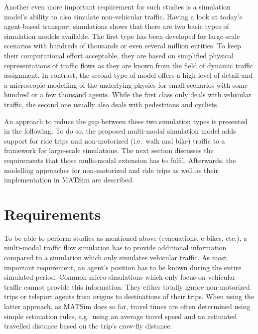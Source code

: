 Another even more important requirement for such studies is a simulation model's ability to also simulate non-vehicular traffic. Having a look at today's agent-based transport simulations shows that there are two basic types of simulation models available. The first type has been developed for large-scale scenarios with hundreds of thousands or even several million entities. To keep their computational effort acceptable, they are based on simplified physical representations of traffic flows as they are known from the field of dynamic traffic assignment. In contrast, the second type of model offers a high level of detail and a microscopic modelling of the underlying physics for small scenarios with some hundred or a few thousand agents. While the first class only deals with vehicular traffic, the second one usually also deals with pedestrians and cyclists.

An approach to reduce the gap between these two simulation types is presented in the following. To do so, the proposed multi-modal simulation model adds support for ride trips and non-motorized (i.e.~walk and bike) traffic to a framework for large-scale simulations. The next section discusses the requirements that those multi-modal extension has to fulfil. Afterwards, the modelling approaches for non-motorized and ride trips as well as their implementation in MATSim are described.

\section{Requirements}
To be able to perform studies as mentioned above (evacuations, e-bikes, etc.), a multi-modal traffic flow simulation has to provide additional information compared to a simulation which only simulates vehicular traffic. As most important requirement, an agent's position has to be known during the entire simulated period. Common micro-simulations which only focus on vehicular traffic cannot provide this information. They either totally ignore non-motorized trips or teleport agents from origins to destinations of their trips. When using the latter approach, as MATSim does so far, travel times are often determined using simple estimation rules, e.g.~using an average travel speed and an estimated travelled distance based on the trip's crow-fly distance.


